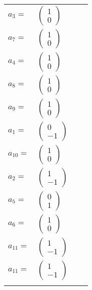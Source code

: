 \documentclass[1p]{elsarticle_modified}
\theoremstyle{definition}
\begin{document}
\begin{tabular}{m{7pt} m{180pt} m{7pt} m{180pt} }
\flushright $a_{3}=$&$\begin{pmatrix}1\\0\end{pmatrix}$ \\
\flushright $a_{7}=$&$\begin{pmatrix}1\\0\end{pmatrix}$ \\
\flushright $a_{4}=$&$\begin{pmatrix}1\\0\end{pmatrix}$ \\
\flushright $a_{8}=$&$\begin{pmatrix}1\\0\end{pmatrix}$ \\
\flushright $a_{9}=$&$\begin{pmatrix}1\\0\end{pmatrix}$ \\
\flushright $a_{1}=$&$\begin{pmatrix}0\\-1\end{pmatrix}$ \\
\flushright $a_{10}=$&$\begin{pmatrix}1\\0\end{pmatrix}$ \\
\flushright $a_{2}=$&$\begin{pmatrix}1\\-1\end{pmatrix}$ \\
\flushright $a_{5}=$&$\begin{pmatrix}0\\1\end{pmatrix}$ \\
\flushright $a_{6}=$&$\begin{pmatrix}1\\0\end{pmatrix}$ \\
\flushright $a_{11}=$&$\begin{pmatrix}1\\-1\end{pmatrix}$\\ \flushright $a_{11}=$&$\begin{pmatrix}1\\-1\end{pmatrix}$\\&\end{tabular}
\end{document}
